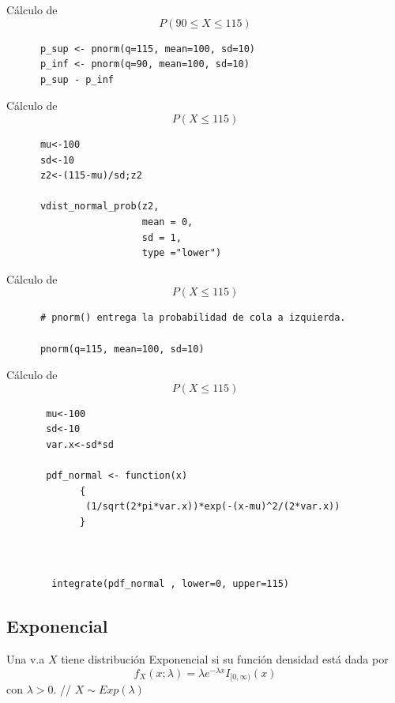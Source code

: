 \begin{i}
\vspace{5mm}
Cálculo de 
$$
P(90 \leq X \leq 115)
$$
\begin{lstlisting}
      p_sup <- pnorm(q=115, mean=100, sd=10)
      p_inf <- pnorm(q=90, mean=100, sd=10)
      p_sup - p_inf
\end{lstlisting}
\vspace{5mm}

Cálculo de
$$
P(X \leq 115)
$$
\begin{lstlisting}
      mu<-100
      sd<-10
      z2<-(115-mu)/sd;z2

      vdist_normal_prob(z2,
                        mean = 0,
                        sd = 1,
                        type ="lower")
\end{lstlisting}

\vspace{5mm}
Cálculo de
$$
P(X \leq 115)
$$
\begin{lstlisting}
      # pnorm() entrega la probabilidad de cola a izquierda.

      pnorm(q=115, mean=100, sd=10)
\end{lstlisting}

\vspace{5mm}
Cálculo de
$$
P(X \leq 115)
$$

\begin{lstlisting}
       mu<-100
       sd<-10
       var.x<-sd*sd

       pdf_normal <- function(x) 
             {
              (1/sqrt(2*pi*var.x))*exp(-(x-mu)^2/(2*var.x))
             }



        integrate(pdf_normal , lower=0, upper=115)
\end{lstlisting}

\subsection{Exponencial}

\begin{definition}
Una v.a $X$ tiene distribución Exponencial si su función densidad está dada por 
\begin{equation*}
f_{X}(x;\lambda )=\lambda e^{-\lambda x}I_{[0,\infty )}(x)
\end{equation*}
con $\lambda >0$. // $X\sim Exp(\lambda )$
\end{definition}


\end{i}

